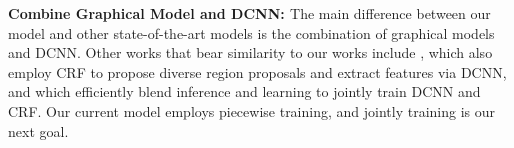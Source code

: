 {\bf{Combine Graphical Model and DCNN: }} The main difference between our model and other state-of-the-art models is the combination of graphical models and DCNN. Other works that bear similarity to our works include \citet{cogswell2014combining}, which also employ CRF to propose diverse region proposals \citep{yadollahpour2013discriminative} and extract features via DCNN, and \citet{chen2014learning} which efficiently blend inference and learning to jointly train DCNN and CRF. Our current model employs piecewise training, and jointly training is our next goal.



